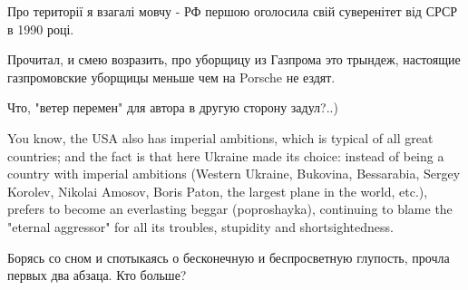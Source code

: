 \begin{itemize}
Про території я взагалі мовчу - РФ першою оголосила свій суверенітет від СРСР в
1990 році.


 
Прочитал, и смею возразить, про уборщицу из Газпрома это трындеж, настоящие
газпромовские уборщицы меньше чем на Porsche не ездят.

 
Что, "ветер перемен" для автора в другую сторону задул?..)

 

You know, the USA also has imperial ambitions, which is typical of all great
countries; and the fact is that here Ukraine made its choice: instead of being
a country with imperial ambitions (Western Ukraine, Bukovina, Bessarabia,
Sergey Korolev, Nikolai Amosov, Boris Paton, the largest plane in the world,
etc.), prefers to become an everlasting beggar (poproshayka), continuing to
blame the "eternal aggressor" for all its troubles, stupidity and
shortsightedness.


 

Борясь со сном и спотыкаясь о бесконечную и беспросветную глупость, прочла
первых два абзаца. Кто больше?

\begin{itemize}
 

\end{itemize}
\end{itemize}
